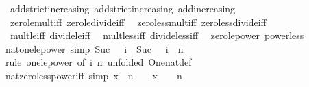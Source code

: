\begin{isabellebody}
\ \ add{\isacharunderscore}{\kern0pt}strict{\isacharunderscore}{\kern0pt}increasing\ add{\isacharunderscore}{\kern0pt}strict{\isacharunderscore}{\kern0pt}increasing{}\ add{\isacharunderscore}{\kern0pt}increasing\isanewline
\ \ zero{\isacharunderscore}{\kern0pt}le{\isacharunderscore}{\kern0pt}mult{\isacharunderscore}{\kern0pt}iff\ zero{\isacharunderscore}{\kern0pt}le{\isacharunderscore}{\kern0pt}divide{\isacharunderscore}{\kern0pt}iff\isanewline
\ \ zero{\isacharunderscore}{\kern0pt}less{\isacharunderscore}{\kern0pt}mult{\isacharunderscore}{\kern0pt}iff\ zero{\isacharunderscore}{\kern0pt}less{\isacharunderscore}{\kern0pt}divide{\isacharunderscore}{\kern0pt}iff\isanewline
\ \ mult{\isacharunderscore}{\kern0pt}le{\isacharunderscore}{\kern0pt}{}{\isacharunderscore}{\kern0pt}iff\ divide{\isacharunderscore}{\kern0pt}le{\isacharunderscore}{\kern0pt}{}{\isacharunderscore}{\kern0pt}iff\isanewline
\ \ mult{\isacharunderscore}{\kern0pt}less{\isacharunderscore}{\kern0pt}{}{\isacharunderscore}{\kern0pt}iff\ divide{\isacharunderscore}{\kern0pt}less{\isacharunderscore}{\kern0pt}{}{\isacharunderscore}{\kern0pt}iff\isanewline
\ \ zero{\isacharunderscore}{\kern0pt}le{\isacharunderscore}{\kern0pt}power{}\ power{}{\isacharunderscore}{\kern0pt}less{\isacharunderscore}{\kern0pt}{}%
\isadelimdocument
%
\endisadelimdocument
%
\isatagdocument
%
\isamarkuptrue%
%
\endisatagdocument
{\isafolddocument}%
%
\isadelimdocument
%
\endisadelimdocument
{}\isamarkupfalse%
\ nat{\isacharunderscore}{\kern0pt}one{\isacharunderscore}{\kern0pt}le{\isacharunderscore}{\kern0pt}power\ {\isacharbrackleft}{\kern0pt}simp{\isacharbrackright}{\kern0pt}{\isacharcolon}{\kern0pt}\ {\isachardoublequoteopen}Suc\ {}\ {\isasymle}\ i\ {\isasymLongrightarrow}\ Suc\ {}\ {\isasymle}\ i\ {\isacharcircum}{\kern0pt}\ n{\isachardoublequoteclose}\isanewline
%
\isadelimproof
\ \ %
\endisadelimproof
%
\isatagproof
{}\isamarkupfalse%
\ {\isacharparenleft}{\kern0pt}rule\ one{\isacharunderscore}{\kern0pt}le{\isacharunderscore}{\kern0pt}power\ {\isacharbrackleft}{\kern0pt}of\ i\ n{\isacharcomma}{\kern0pt}\ unfolded\ One{\isacharunderscore}{\kern0pt}nat{\isacharunderscore}{\kern0pt}def{\isacharbrackright}{\kern0pt}{\isacharparenright}{\kern0pt}%
\endisatagproof
{\isafoldproof}%
%
\isadelimproof
\isanewline
%
\endisadelimproof
\isanewline
{}\isamarkupfalse%
\ nat{\isacharunderscore}{\kern0pt}zero{\isacharunderscore}{\kern0pt}less{\isacharunderscore}{\kern0pt}power{\isacharunderscore}{\kern0pt}iff\ {\isacharbrackleft}{\kern0pt}simp{\isacharbrackright}{\kern0pt}{\isacharcolon}{\kern0pt}\ {\isachardoublequoteopen}x\ {\isacharcircum}{\kern0pt}\ n\ {\isachargreater}{\kern0pt}\ {}\ {\isasymlongleftrightarrow}\ x\ {\isachargreater}{\kern0pt}\ {}\ {\isasymor}\ n\ {\isacharequal}{\kern0pt}\ {}{\isachardoublequoteclose}\isanewline

\end{isabellebody}

